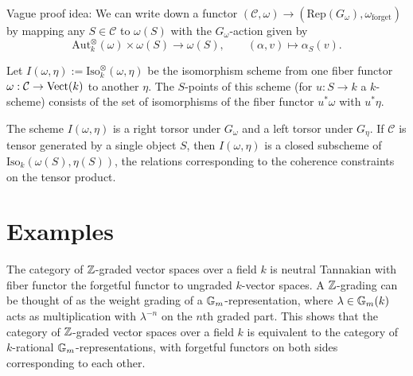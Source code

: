  Vague proof idea: We can write down a functor $(\mathcal{C},\omega) \to (\mathrm{Rep}(G_\omega),\omega_\textrm{forget})$ by mapping any $S \in \mathcal{C}$ to $\omega(S)$ with the $G_\omega$-action given by
\[
\mathrm{Aut}_k^{\otimes}(\omega) \times \omega(S) \to \omega(S),\qquad (\alpha,v) \mapsto \alpha_{S}(v).
\]


\begin{defn}
 Let $I(\omega,\eta) := \mathrm{Iso}^{\otimes}_k(\omega,\eta)$ be the isomorphism scheme from one fiber functor $\omega : \mathcal{C} \to \mathrm{Vect}(k)$ to another $\eta$. The $S$-points of this scheme (for $u : S \to k$ a $k$-scheme) consists of the set of isomorphisms of the fiber functor $u^\ast \omega$ with $u^\ast \eta$.

The scheme $I(\omega,\eta)$ is a right torsor under $G_\omega$ and a left torsor under $G_\eta$.
If $\mathcal{C}$ is tensor generated by a single object $S$, then $I(\omega,\eta)$ is a closed subscheme of $\mathrm{Iso}_k(\omega(S),\eta(S))$, the relations corresponding to the coherence constraints on the tensor product.
\end{defn}


















\section{Examples}

\begin{exam}
 The category of $\mathbb{Z}$-graded vector spaces over a field $k$ is neutral Tannakian with fiber functor the forgetful functor to ungraded $k$-vector spaces. A $\mathbb{Z}$-grading can be thought of as the weight grading of a $\mathbb{G}_m$-representation, where $\lambda \in \mathbb{G}_m(k)$ acts as multiplication with $\lambda^{-n}$ on the $n$th graded part. This shows that the category of $\mathbb{Z}$-graded vector spaces over a field $k$ is equivalent to the category of $k$-rational $\mathbb{G}_m$-representations, with forgetful functors on both sides corresponding to each other.
\end{exam}


